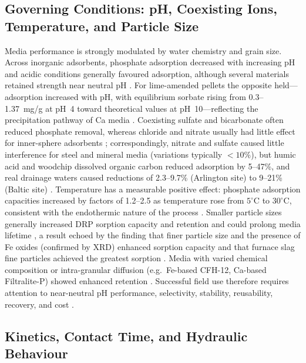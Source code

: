 \subsection{Governing Conditions: pH, Coexisting Ions, Temperature, and Particle Size}

Media performance is strongly modulated by water chemistry and grain size.
Across inorganic adsorbents, phosphate adsorption decreased with increasing pH
and acidic conditions generally favoured adsorption, although several materials
retained strength near neutral pH \parencite{Li2020}. For lime-amended pellets
the opposite held---adsorption increased with pH, with equilibrium sorbate rising
from 0.3--1.37~mg/g at pH~4 toward theoretical values at pH~10---reflecting the
precipitation pathway of Ca media \parencite{Li2017}. Coexisting sulfate and
bicarbonate often reduced phosphate removal, whereas chloride and nitrate usually
had little effect for inner-sphere adsorbents \parencite{Li2020}; correspondingly,
nitrate and sulfate caused little interference for steel and mineral media
(variations typically $<10\%$), but humic acid and woodchip dissolved organic
carbon reduced adsorption by 5--47\%, and real drainage waters caused reductions
of 2.3--9.7\% (Arlington site) to 9--21\% (Baltic site) \parencite{Sellner2019b}.
Temperature has a measurable positive effect: phosphate adsorption capacities
increased by factors of 1.2--2.5 as temperature rose from $5^{\circ}$C to
$30^{\circ}$C, consistent with the endothermic nature of the process
\parencite{Sellner2019b}. Smaller particle sizes generally increased DRP sorption
capacity and retention and could prolong media lifetime \parencite{Mendes2022},
a result echoed by the finding that finer particle size and the presence of Fe
oxides (confirmed by XRD) enhanced sorption capacity \parencite{Pugliese2023}
and that furnace slag fine particles achieved the greatest sorption
\parencite{Sanford2016}. Media with varied chemical composition or intra-granular
diffusion (e.g.\ Fe-based CFH-12, Ca-based Filtralite-P) showed enhanced retention
\parencite{Mendes2022}. Successful field use therefore requires attention to
near-neutral pH performance, selectivity, stability, reusability, recovery, and
cost \parencite{Li2020}.

\subsection{Kinetics, Contact Time, and Hydraulic Behaviour}


